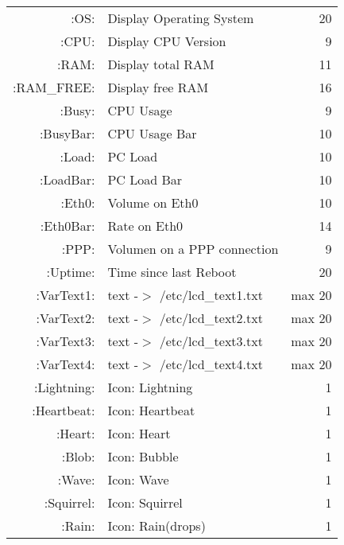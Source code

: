 \begin{description}
\begin{small}
\begin{center}
\begin{longtable}{rp{7cm}r}
                    :OS: &       Display Operating System      &  20 \\
                   :CPU: &       Display CPU Version         &   9 \\
                   :RAM: &       Display total RAM	     &  11 \\
             :RAM\_FREE: &       Display free RAM 	     &  16 \\                   
                  :Busy: &       CPU Usage		     &   9 \\
               :BusyBar: &       CPU Usage Bar		     &  10 \\
                  :Load: &       PC Load     		     &  10 \\
               :LoadBar: &       PC Load Bar  		     &  10 \\
                  :Eth0: &       Volume on Eth0              &  10 \\
               :Eth0Bar: &       Rate on Eth0                &  14 \\
                   :PPP: &       Volumen on a PPP connection &   9 \\
                :Uptime: &       Time since last Reboot      &  20 \\

              :VarText1: &       text -$>$ /etc/lcd\_text1.txt  & max 20 \\
              :VarText2: &       text -$>$ /etc/lcd\_text2.txt  & max 20 \\
              :VarText3: &       text -$>$ /etc/lcd\_text3.txt  & max 20 \\
              :VarText4: &       text -$>$ /etc/lcd\_text4.txt  & max 20 \\

             :Lightning: &       Icon: Lightning             &  1 \\
             :Heartbeat: &       Icon: Heartbeat             &  1 \\
                 :Heart: &       Icon: Heart                 &  1 \\
                  :Blob: &       Icon: Bubble                &  1 \\
                  :Wave: &       Icon: Wave                  &  1 \\
              :Squirrel: &       Icon: Squirrel              &  1 \\
                  :Rain: &       Icon: Rain(drops)           &  1 \\


\end{longtable}
\end{center}
\end{small}
\end{description}
